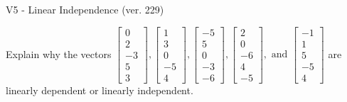 \begin{exercise}
  \begin{exerciseTitle}V5 - Linear Independence (ver. 229)\end{exerciseTitle}
  \begin{exerciseStatement}
    Explain why the vectors \(\left[\begin{array}{r}
0 \\
2 \\
-3 \\
5 \\
3
\end{array}\right] , \left[\begin{array}{r}
1 \\
3 \\
0 \\
-5 \\
4
\end{array}\right] , \left[\begin{array}{r}
-5 \\
5 \\
0 \\
-3 \\
-6
\end{array}\right] , \left[\begin{array}{r}
2 \\
0 \\
-6 \\
4 \\
-5
\end{array}\right] , \text{ and } \left[\begin{array}{r}
-1 \\
1 \\
5 \\
-5 \\
4
\end{array}\right]\) are linearly dependent or linearly independent.	



\end{exerciseStatement}
\end{exercise}
